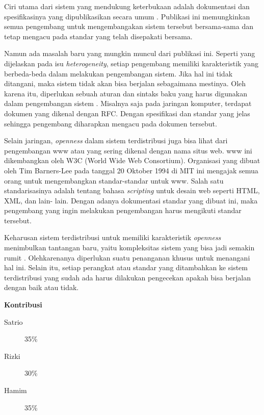 \documentclass[12pt,a4paper]{apa}
\begin{document}
	Ciri utama dari sistem yang mendukung keterbukaan adalah dokumentasi dan spesifikasinya yang dipublikasikan secara umum \cite{Kamalapur2008}. Publikasi ini memungkinkan semua pengembang untuk  mengembangakan sistem tersebut bersama-sama dan tetap mengacu pada standar yang telah disepakati bersama.
	
	Namun ada masalah baru yang mungkin muncul dari publikasi ini. Seperti yang dijelaskan pada isu \emph{heterogeneity}, setiap pengembang memiliki karakteristik yang berbeda-beda dalam melakukan pengembangan sistem. Jika hal ini tidak ditangani, maka sistem tidak akan bisa berjalan sebagaimana mestinya. Oleh karena itu, diperlukan sebuah aturan dan sintaks baku yang harus digunakan dalam pengembangan sistem \cite{Tanenbaum2007}. Misalnya saja pada jaringan komputer, terdapat dokumen yang dikenal dengan RFC. Dengan spesifikasi dan standar yang jelas sehingga pengembang diharapkan mengacu pada dokumen tersebut.
	
	Selain jaringan, \emph{openness} dalam sistem terdistribusi juga bisa lihat dari pengembangan www atau yang sering dikenal dengan nama situs web. www ini dikembangkan oleh W3C (World Wide Web Consortium). Organisasi yang dibuat oleh Tim Barners-Lee pada tanggal 20 Oktober 1994 di MIT ini mengajak semua orang untuk mengembangkan standar-standar untuk www. Salah satu standarisasinya adalah tentang bahasa \emph{scripting} untuk desain web seperti HTML, XML, dan lain- lain. Dengan adanya dokumentasi standar yang dibuat ini, maka pengembang yang ingin melakukan pengembangan harus mengikuti standar tersebut. 
	
	Keharusan sistem terdistribusi untuk memiliki karakteristik \emph{openness} menimbulkan tantangan baru, yaitu kompleksitas sistem yang bisa jadi semakin rumit \cite{Coulouris2012}. Olehkarenanya diperlukan suatu penanganan khusus untuk menangani hal ini. Selain itu, setiap perangkat atau standar yang ditambahkan ke sistem terdistribusi yang sudah ada harus dilakukan pengecekan apakah bisa berjalan dengan baik atau tidak. \cite{Coulouris2012}
	
	
	
	\newpage
	
	\begin{center}
		\textbf{Kontribusi}
	\end{center}
	\begin{description}
		\item[Satrio] 35\%
		\item[Rizki] 30\%
		\item[Hamim] 35\%
	\end{description}
\end{document}
